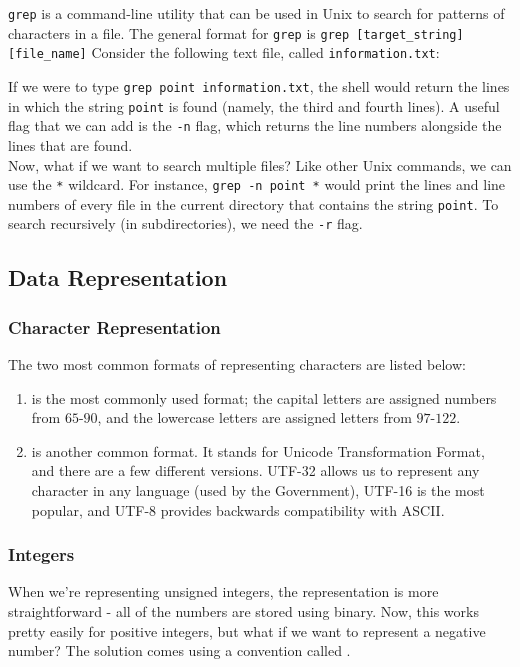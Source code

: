 \verb!grep! is a command-line utility that can be used in Unix to search for patterns of characters in a file. The general format for \verb!grep! is \verb!grep [target_string] [file_name]! Consider the following text file, called \verb!information.txt!:

\lstset{
caption=Text Sample}
\begin{center}
\label{Text Sample}
\end{center}

If we were to type \verb!grep point information.txt!, the shell would return the lines in which the string \verb!point! is found (namely, the third and fourth lines). A useful flag that we can add is the \verb!-n! flag, which returns the line numbers alongside the lines that are found. \\

Now, what if we want to search multiple files? Like other Unix commands, we can use the \verb!*! wildcard. For instance, \verb!grep -n point *! would print the lines and line numbers of every file in the current directory that contains the string \verb!point!. To search recursively (in subdirectories), we need the \verb!-r! flag. 




\subsection{Data Representation}
\subsubsection{Character Representation}
The two most common formats of representing characters are listed below: \begin{enumerate}
    \item {} is the most commonly used format; the capital letters are assigned numbers from $65$-$90$, and the lowercase letters are assigned letters from $97$-$122$. 
    \item {} is another common format. It stands for Unicode Transformation Format, and there are a few different versions. UTF-32 allows us to represent any character in any language (used by the Government), UTF-16 is the most popular, and UTF-8 provides backwards compatibility with ASCII.
\end{enumerate}
\subsubsection{Integers}
When we're representing unsigned integers, the representation is more straightforward - all of the numbers are stored using binary. Now, this works pretty easily for positive integers, but what if we want to represent a negative number? The solution comes using a convention called . 


